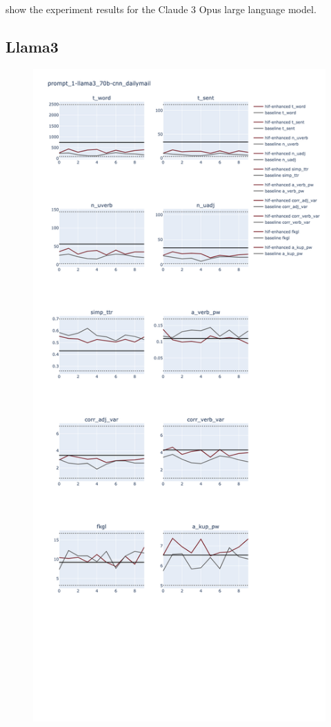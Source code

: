 \documentclass[11pt]{article}
\begin{document}
show the experiment results for the Claude 3 Opus large language model.

\subsection{Llama3}

\begin{figure}[ht]
    \includegraphics[width=\textwidth,height=0.9\textheight,scale=1]{plots/prompt_1/prompt_1-llama3_70b-cnn_dailymail/prompt_1-llama3_70b-cnn_dailymail.png}

\end{figure}
\end{document}
